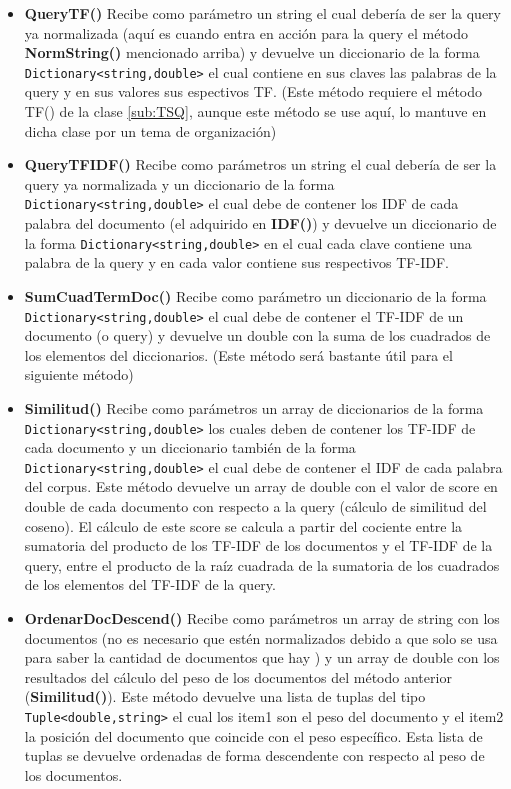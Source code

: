 \documentclass[a4paper,12pt]{article}
\begin{document}
\begin{itemize}
    \item \textbf{QueryTF()}
Recibe como parámetro un string el cual debería de ser la query ya normalizada (aquí es cuando entra en acción para la query el método \textbf{NormString()} 
mencionado arriba) y devuelve un diccionario de la forma  \texttt{Dictionary\textless string,double\textgreater} el cual contiene en sus claves las palabras de la 
query y en sus valores sus espectivos TF. (Este método requiere el método TF() de la clase \ref{sub:TSQ}, aunque este método se use aquí, lo mantuve en dicha
 clase por un tema de organización)

    \item \textbf{QueryTFIDF()}
Recibe como parámetros un string el cual debería de ser la query ya normalizada y un diccionario de la forma \texttt{Dictionary\textless string,double\textgreater} el cual debe de contener los IDF de cada palabra del documento (el adquirido en \textbf{IDF()}) y devuelve un diccionario de la forma \texttt{Dictionary\textless string,double\textgreater} en el cual cada clave contiene una palabra de la query y en cada valor contiene sus respectivos TF-IDF.

    \item \textbf{SumCuadTermDoc()}
Recibe como parámetro un diccionario de la forma \texttt{Dictionary\textless string,double\textgreater} el cual debe de contener el TF-IDF de un documento 
(o query) y devuelve un double con la suma de los cuadrados de los elementos del diccionarios. (Este método será bastante útil para el siguiente método)

    \item \textbf{Similitud()}
Recibe como parámetros un array de diccionarios de la forma \texttt{Dictionary\textless string,double\textgreater} los cuales deben de contener los TF-IDF de 
cada documento y un diccionario también de la forma \texttt{Dictionary\textless string,double\textgreater} el cual debe de contener el IDF de cada palabra del
corpus. Este método devuelve un array de double con el valor de score en double de cada documento con respecto a la query (cálculo de similitud del coseno). 
El cálculo de este score se calcula a partir del cociente entre la sumatoria del producto de los TF-IDF de los documentos y el TF-IDF de la query, entre el producto 
de la raíz cuadrada de la sumatoria de los cuadrados de los elementos del TF-IDF de la query.

    \item \textbf{OrdenarDocDescend()}
Recibe como parámetros un array de string con los documentos (no es necesario que estén normalizados debido a que solo se usa para saber la cantidad de 
documentos que hay ) y un array de double con los resultados del cálculo del peso de los documentos del método anterior (\textbf{Similitud()}). Este método 
devuelve una lista de tuplas del tipo \texttt{Tuple\textless double,string\textgreater} el cual los item1 son el peso del documento y el item2 la posición del documento que coincide con el peso específico. Esta lista de tuplas se devuelve ordenadas de forma descendente con respecto al peso de los documentos. 
\end{itemize}
\end{document}
